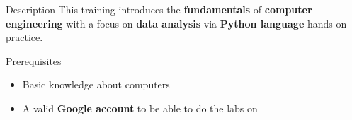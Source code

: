 \begin{frame}{Description}
  This training introduces the \textbf{fundamentals} of \textbf{computer engineering} with a focus on \textbf{data analysis} via \textbf{Python language} hands-on practice.
\end{frame}

\begin{frame}{Prerequisites}
  \begin{itemize}
  \item Basic knowledge about computers
  \item A valid \textbf{Google account} to be able to do the labs on 
  \end{itemize}
\end{frame}
